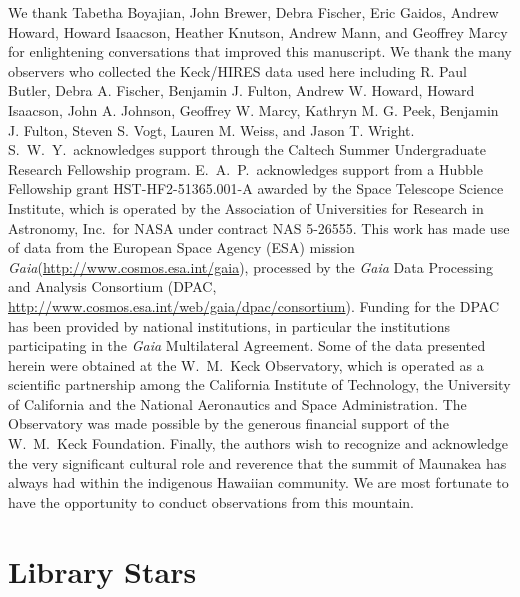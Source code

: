 \documentclass[preprint2]{aastex6}
\newcommand{\Gaia}{\textit{Gaia}\xspace}
\begin{document}
\acknowledgments
We thank Tabetha Boyajian, John Brewer, Debra Fischer, Eric Gaidos, Andrew Howard, Howard Isaacson, Heather Knutson, Andrew Mann, and Geoffrey Marcy for enlightening conversations that improved this manuscript. We thank the many observers who collected the Keck/HIRES data used here including R. Paul Butler, Debra A. Fischer, Benjamin J. Fulton, Andrew W. Howard, Howard Isaacson, John A. Johnson, Geoffrey W. Marcy, Kathryn M. G. Peek, Benjamin J. Fulton, Steven S. Vogt, Lauren M. Weiss, and Jason T. Wright. S.~W.~Y.\ acknowledges support through the Caltech Summer Undergraduate Research Fellowship program.  E.~A.~P.\ acknowledges support from a Hubble Fellowship grant HST-HF2-51365.001-A awarded by the Space Telescope Science Institute, which is operated by the Association of Universities for Research in Astronomy, Inc.~for NASA under contract NAS 5-26555. This work has made use of data from the European Space Agency (ESA) mission \Gaia (\url{http://www.cosmos.esa.int/gaia}), processed by the \Gaia Data Processing and Analysis Consortium (DPAC, \url{http://www.cosmos.esa.int/web/gaia/dpac/consortium}). Funding for the DPAC has been provided by national institutions, in particular the institutions participating in the \Gaia Multilateral Agreement. Some of the data presented herein were obtained at the W.~M.~Keck Observatory, which is operated as a scientific partnership among the California Institute of Technology, the University of California and the National Aeronautics and Space Administration. The Observatory was made possible by the generous financial support of the W.~M.~Keck Foundation. Finally, the authors wish to recognize and acknowledge the very significant cultural role and reverence that the summit of Maunakea has always had within the indigenous Hawaiian community.  We are most fortunate to have the opportunity to conduct observations from this mountain.

\clearpage
\appendix
\section{Library Stars}
\end{document}
